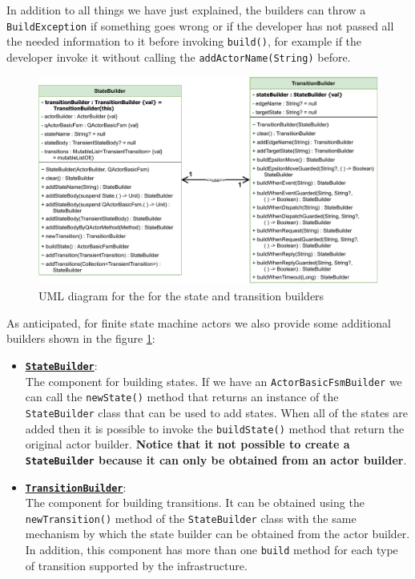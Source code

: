 In addition to all things we have just explained, the builders can throw a \texttt{BuildException} if something goes wrong or if the developer has not passed all the needed information to it before invoking \verb*|build()|, for example if the developer invoke it without calling the \verb*|addActorName(String)| before.

\begin{figure}[h]
	\centering
	\includegraphics[width=\textwidth]{img/[UML]it.unibo.kaktor.builders_stateb_transitionb}
	\caption{UML diagram for the for the state and transition builders}
	\label{fig::builders_stateb_transitionb}
\end{figure}
As anticipated, for finite state machine actors we also provide some additional builders shown in the figure \ref{fig::builders_stateb_transitionb}:

\begin{itemize}
	\item 	\href{https://github.com/LM-96/QA-Extensions/blob/main/it.unibo.qakactor/src/main/kotlin/builders/StateBuilder.kt}{\underline{\textbf{\texttt{StateBuilder}}}}:\\
	The component for building states. If we have an \texttt{ActorBasicFsmBuilder} we can call the \verb*|newState()| method that returns an instance of the \texttt{StateBuilder} class that can be used to add states. When all of the states are added then it is possible to invoke the \texttt{buildState()} method that return the original actor builder. \textbf{Notice that it not possible to create a \texttt{StateBuilder} because it can only be obtained from an actor builder}.
	
	\item 	\href{https://github.com/LM-96/QA-Extensions/blob/main/it.unibo.qakactor/src/main/kotlin/builders/TransitionBuilder.kt}{\underline{\textbf{\texttt{TransitionBuilder}}}}:\\
	The component for building transitions. It can be obtained using the \verb*|newTransition()| method of the \texttt{StateBuilder} class with the same mechanism by which the state builder can be obtained from the actor builder. In addition, this component has more than one \texttt{build} method for each type of transition supported by the infrastructure.
\end{itemize}

